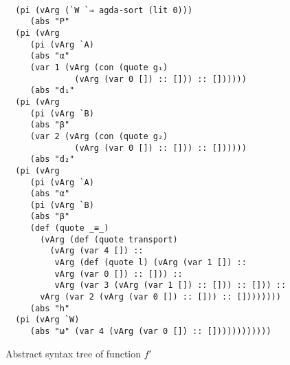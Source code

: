 \documentclass[sigplan,10pt]{acmart}
\begin{document}
\begin{figure}
\begin{center}
\begingroup
\fontsize{7pt}{9pt}\selectfont
\begin{Verbatim}[frame = single]

  (pi (vArg (`W `⇒ agda-sort (lit 0)))
     (abs "P"
  (pi (vArg
     (pi (vArg `A)
     (abs "α"
     (var 1 (vArg (con (quote g₁) 
              (vArg (var 0 []) :: [])) :: [])))))
     (abs "d₁"
  (pi (vArg
     (pi (vArg `B)
     (abs "β"
     (var 2 (vArg (con (quote g₂) 
              (vArg (var 0 []) :: [])) :: [])))))
     (abs "d₂"
  (pi (vArg
     (pi (vArg `A)
     (abs "α"
     (pi (vArg `B)
     (abs "β"
     (def (quote _≡_)
       (vArg (def (quote transport)
         (vArg (var 4 []) ::
          vArg (def (quote l) (vArg (var 1 []) :: 
          vArg (var 0 []) :: [])) ::
          vArg (var 3 (vArg (var 1 []) :: [])) :: [])) :: 
       vArg (var 2 (vArg (var 0 []) :: [])) :: [])))))))
     (abs "h"
  (pi (vArg `W)
     (abs "ω" (var 4 (vArg (var 0 []) :: [])))))))))))

\end{Verbatim}
\endgroup
\end{center}
\caption{Abstract syntax tree of function $f'$}
\label{fig:ast-ind-f'}
\end{figure}
\end{document}
